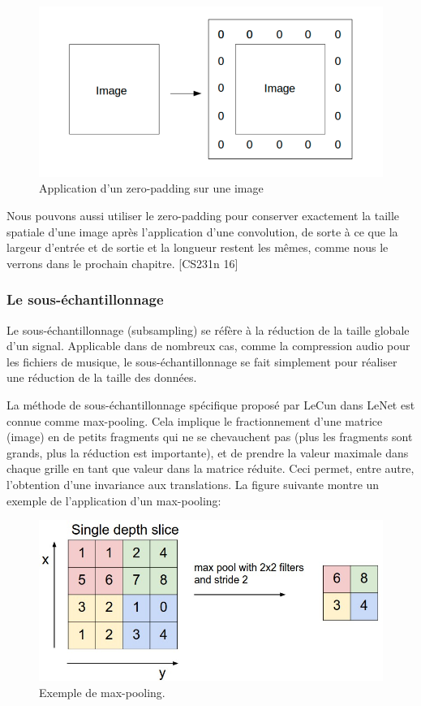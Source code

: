 \begin{figure}[H]
	\centering
		\includegraphics[width=5in]{Figures/zero-padding.png}
	\caption[An Electron]{Application d'un zero-padding sur une image}
	\label{fig:Electron}
\end{figure}

	Nous pouvons aussi utiliser le zero-padding pour conserver exactement la taille spatiale d'une image après l'application d'une convolution, de sorte à ce que la largeur d'entrée et de sortie et la longueur restent les mêmes, comme nous le verrons dans le prochain chapitre. [CS231n 16]


\subsubsection{Le sous-échantillonnage}

	Le sous-échantillonnage (subsampling) se réfère à la réduction de la taille globale d'un signal. Applicable dans de nombreux cas, comme la compression audio pour les fichiers de musique, le sous-échantillonnage se fait simplement pour réaliser une réduction de la taille des données. 

	La méthode de sous-échantillonnage spécifique proposé par LeCun dans LeNet est connue comme max-pooling. Cela implique le fractionnement d'une matrice (image) en de petits fragments qui ne se chevauchent pas (plus les fragments sont grands, plus la réduction est importante), et de prendre la valeur maximale dans chaque grille en tant que valeur dans la matrice réduite. 
	Ceci permet, entre autre, l'obtention d'une invariance aux translations. La figure suivante montre un exemple de l'application d'un max-pooling:

\begin{figure}[H]
	\centering
		\includegraphics[width=5in]{Figures/maxpool.jpeg}
	\caption[MP]{Exemple de max-pooling.}
	\label{fig:Electron}
\end{figure}


